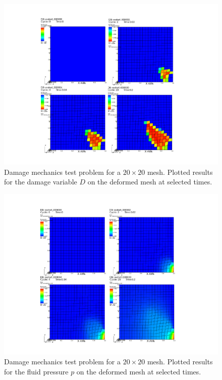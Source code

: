 \documentclass[11pt]{article} %
\begin{document}
\begin{figure} [!ht]
	\centering
	\includegraphics[width = 5.0in,trim=110 20 130 30,clip=true]{highdamage.pdf}
	\caption{Damage mechanics test problem for a $20 \times 20$ mesh. Plotted results for the damage variable $D$ on the deformed mesh at selected times.}
	\label{fig:highdamage}
\end{figure}

\begin{figure} [!ht]
	\centering
	\includegraphics[width = 5.0in,trim=110 20 130 30,clip=true]{highpressure.pdf}
	\caption{Damage mechanics test problem for a $20 \times 20$ mesh. Plotted results for the fluid pressure $p$ on the deformed mesh at selected times.}
	\label{fig:highpressure}
\end{figure}
\end{document}
